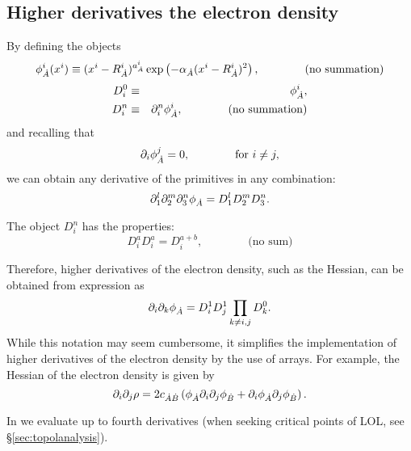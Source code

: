 \subsection{Higher derivatives the electron density}

By defining the objects
%
\begin{equation}
   \phi^i_{\dot{A}}(x^i)\equiv(x^i-R^i_{\dot{A}})^{a^i_{\dot{A}}}\exp\left(-\alpha_{\dot{A}}(x^i-R^i_{\dot{A}})^2\right),
   \qquad\qquad\textrm{(no summation)}
\end{equation}
%
%
\begin{eqnarray}
   D_i^0&\equiv&\phi^i_{\dot{A}},\nonumber\\
   D_i^n&\equiv&\partial_i^n\phi^i_{\dot{A}},\qquad\qquad\textrm{(no summation)}
\end{eqnarray}
%
and recalling that
%
\begin{equation}
   \partial_i\phi^j_{\dot{A}}=0,\qquad\qquad\textrm{for }i\neq j,
\end{equation}
%
we can obtain any derivative of the primitives in any combination:
%
\begin{equation}
   \partial_1^l\partial_2^m\partial_3^n\phi_{\dot{A}}=D_1^lD_2^mD_3^n.
\end{equation}
%

The object $D_i^n$ has the properties:
%
\begin{equation}
   D^a_iD^a_i=D^{a+b}_i,\qquad\qquad\textrm{(no sum)}
\end{equation}
% 

Therefore, higher derivatives of the electron density, such as the Hessian, can be obtained from expression as
%
\begin{equation}
   \partial_i\partial_k\phi_{\dot{A}}=D_i^1D_j^1\prod_{k\neq i,j}D^0_k.
\end{equation}
%
While this notation may seem cumbersome, it simplifies the implementation of higher derivatives of the electron density by the use of arrays. For example, the Hessian of the electron density is given by
%
\begin{equation}
   \partial_i\partial_j\rho=2c_{\dot{A}\dot{B}}\left(\phi_{\dot{A}}\partial_i\partial_j\phi_{\dot{B}}+\partial_i\phi_{\dot{A}}\partial_j\phi_{\dot{B}}\right).
\end{equation}
%

In \DTK{} we evaluate up to fourth derivatives (when seeking critical points of LOL, see \S\ref{sec:topolanalysis}).

